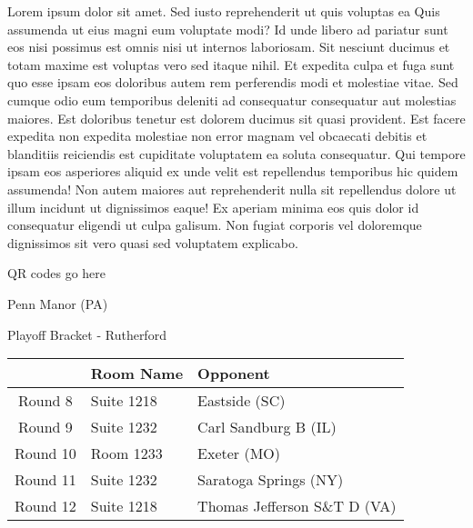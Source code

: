 \documentclass{article}%
\begin{document}
\vspace*{8pt}%
\linebreak%
\newline%
\newline%
Lorem ipsum dolor sit amet. Sed iusto reprehenderit ut quis voluptas ea Quis assumenda ut eius magni eum voluptate modi? Id unde libero ad pariatur sunt eos nisi possimus est omnis nisi ut internos laboriosam. Sit nesciunt ducimus et totam maxime est voluptas vero sed itaque nihil. Et expedita culpa et fuga sunt quo esse ipsam eos doloribus autem rem perferendis modi et molestiae vitae.\newline%
\newline%
Sed cumque odio eum temporibus deleniti ad consequatur consequatur aut molestias maiores. Est doloribus tenetur est dolorem ducimus sit quasi provident. Est facere expedita non expedita molestiae non error magnam vel obcaecati debitis et blanditiis reiciendis est cupiditate voluptatem ea soluta consequatur. Qui tempore ipsam eos asperiores aliquid ex unde velit est repellendus temporibus hic quidem assumenda!\newline%
\newline%
Non autem maiores aut reprehenderit nulla sit repellendus dolore ut illum incidunt ut dignissimos eaque! Ex aperiam minima eos quis dolor id consequatur eligendi ut culpa galisum. Non fugiat corporis vel doloremque dignissimos sit vero quasi sed voluptatem explicabo.\newline%
\newline%
%
\vspace*{30pt}%
\begin{center}%
\begin{Huge}%
QR codes go here%
\end{Huge}%
\end{center}%
\newpage%
\begin{center}%
\begin{Huge}%
Penn Manor (PA)%
\end{Huge}%
\vspace*{8pt}%
\linebreak%
\begin{Large}%
Playoff Bracket {-} Rutherford%
\end{Large}%
\end{center}%
%
\begin{tabularx}{\textwidth}{|c|Y|Y|}%
\hline%
&Room Name&Opponent\\%
\hline%
Round 8&Suite 1218&Eastside (SC)\\%
Round 9&Suite 1232&Carl Sandburg B (IL)\\%
Round 10&Room 1233&Exeter (MO)\\%
Round 11&Suite 1232&Saratoga Springs (NY)\\%
Round 12&Suite 1218&Thomas Jefferson S\&T D (VA)\\%
\hline%
\end{tabularx}%
\end{document}
